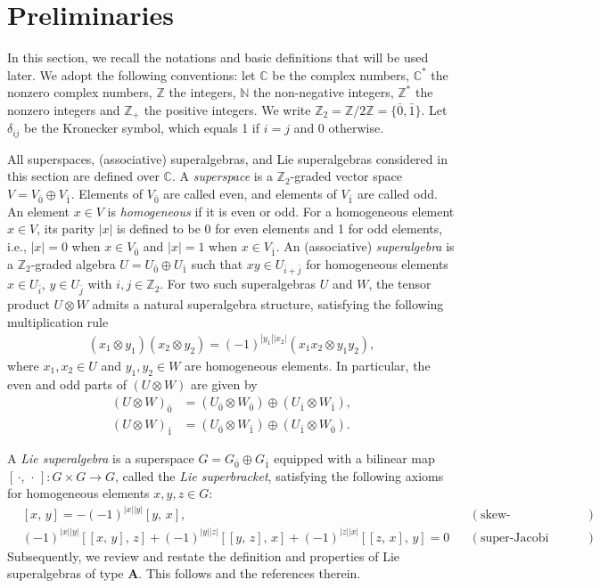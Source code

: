 \documentclass[a4paper,12pt]{article}
\numberwithin{equation}{section}
\begin{document}
\section{Preliminaries}
In this section, we recall the notations and basic definitions that will be used later. We adopt the following conventions: let $\mathbb{C}$ be the complex numbers, $\mathbb{C}^*$ the nonzero complex numbers, $\mathbb{Z}$ the integers, $\mathbb{N}$ the non-negative integers, $\mathbb{Z}^*$ the nonzero integers and $\mathbb{Z}_+$ the positive integers. We write $\mathbb{Z}_2=\mathbb{Z}/2\mathbb{Z}=\{\bar{0},\bar{1}\}$.  Let $\delta_{ij}$ be the Kronecker symbol, which equals 1 if $i=j$ and 0 otherwise. 

All superspaces, (associative) superalgebras, and Lie superalgebras considered in this section are defined over $\mathbb{C}$. 
A \textit{superspace} is a $\mathbb{Z}_2$-graded vector space $V=V_{\bar{0}} \oplus V_{\bar{1}}$. Elements of $V_{\bar{0}}$ are called even, and elements of $V_{\bar{1}}$ are called odd. An element $x\in V$ is  \textit{homogeneous} if it is even or odd. For a homogeneous element $x\in V$, its parity $|x|$ is defined to be 0 for even elements and 1 for odd elements, i.e., $|x|=0$ when $x\in V_{\bar{0}}$ and $|x|=1$ when $x\in V_{\bar{1}}$. 
An (associative) \textit{superalgebra} is a $\mathbb{Z}_2$-graded algebra $U=U_{\bar{0}}\oplus U_{\bar{1}}$ such that $xy\in U_{\bar{i}+\bar{j}}$ for homogeneous elements $x\in U_{\bar{i}}$, $y\in U_{\bar{j}}$ with $i,j\in\mathbb{Z}_2$. For two such superalgebras $U$ and $W$, the tensor product $U\otimes W$ admits a natural superalgebra structure, satisfying the following multiplication rule
\begin{gather*}
    (x_1 \otimes y_1)(x_2 \otimes y_2)=(-1)^{|y_1||x_2|}(x_1x_2 \otimes y_1y_2),
\end{gather*}
where $x_1,x_2\in U$ and  $y_1,y_2\in W$ are homogeneous elements. In particular, the even and odd parts of $(U\otimes W)$ are given by
\begin{align*}
    (U\otimes W)_{\bar{0}}&=(U_{\bar{0}}\otimes W_{\bar{0}})\oplus (U_{\bar{1}}\otimes W_{\bar{1}}), \\
    (U\otimes W)_{\bar{1}}&=(U_{\bar{0}}\otimes W_{\bar{1}})\oplus (U_{\bar{1}}\otimes W_{\bar{0}}). 
\end{align*}


A \textit{Lie superalgebra} is a superspace $G=G_{\bar{0}} \oplus G_{\bar{1}}$ equipped with a bilinear map $[\,\cdot,\, \cdot\,]: G\times G\to G$, called the \textit{Lie superbracket}, satisfying the following axioms for homogeneous elements $x,y,z\in G$:
\begin{align*}
    &[x,\,y]=-(-1)^{|x||y|}[y,\,x],  &&(\text{skew-supersymmetry}) \\
    &(-1)^{|x||y|}[[x,\,y],\,z]+(-1)^{|y||z|}[[y,\,z],\,x]+(-1)^{|z||x|}[[z,\,x],\,y]=0  &&(\text{super-Jacobi identity})
\end{align*}
Subsequently, we review and restate the definition and properties of Lie superalgebras of type $\boldsymbol{A}$. This follows \cite{K77,LZ25,M22,Mu12} and the references therein.
\end{document}
